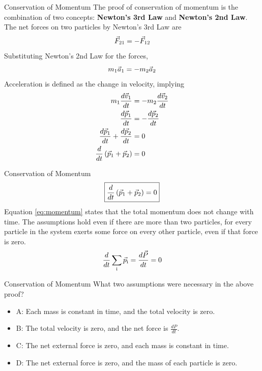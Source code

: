 \documentclass{beamer}
\begin{document}
\begin{frame}{Conservation of Momentum}
\small
The proof of conservation of momentum is the combination of two concepts: \alert{\textbf{Newton's 3rd Law}} and \alert{\textbf{Newton's 2nd Law}}.  The net forces on two particles by Newton's 3rd Law are 
\begin{equation}
\vec{F}_{\rm 21} = -\vec{F}_{\rm 12}
\end{equation}
Substituting Newton's 2nd Law for the forces,
\begin{equation}
m_{\rm 1} \vec{a}_{\rm 1} = -m_{\rm 2}\vec{a}_{\rm 2}
\end{equation}
Acceleration is defined as the change in velocity, implying
\begin{align}
m_{\rm 1} \frac{d\vec{v}_{\rm 1}}{dt} &= -m_{\rm 2} \frac{d\vec{v}_{\rm 2}}{dt} \\
\frac{d\vec{p}_{\rm 1}}{dt} &= -\frac{d\vec{p}_{\rm 2}}{dt} \\
\frac{d\vec{p}_{\rm 1}}{dt} + \frac{d\vec{p}_{\rm 2}}{dt} &= 0 \\
\frac{d}{dt}\left(\vec{p}_{\rm 1} + \vec{p}_{\rm 2}\right) &= 0
\end{align}
\end{frame}

\begin{frame}{Conservation of Momentum}
\begin{equation}
\boxed{
\frac{d}{dt}\left(\vec{p}_{\rm 1} + \vec{p}_{\rm 2}\right) = 0
} \label{eq:momentum}
\end{equation}
Equation \ref{eq:momentum} states that the total momentum does not change with time.  The assumptions hold even if there are more than two particles, for every particle in the system exerts some force on every other particle, even if that force is zero.
\begin{equation}
\frac{d}{dt}\sum_{\rm i} \vec{p}_{\rm i} = \frac{d\vec{P}}{dt} = 0
\end{equation}
\end{frame}

\begin{frame}{Conservation of Momentum}
What two assumptions were necessary in the above proof?
\begin{itemize}
\item A: Each mass is constant in time, and the total velocity is zero.
\item B: The total velocity is zero, and the net force is $\frac{dP}{dt}$.
\item C: The net external force is zero, and each mass is constant in time.
\item D: The net external force is zero, and the mass of each particle is zero.
\end{itemize}
\end{frame}
\end{document}
